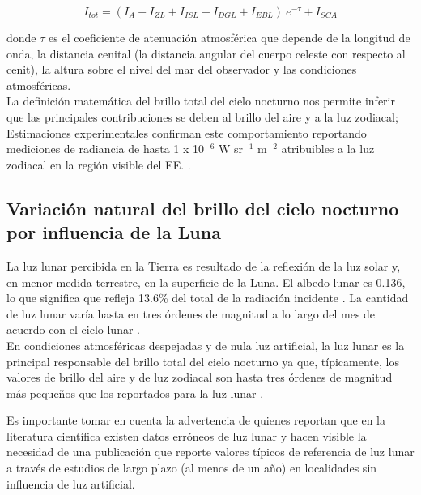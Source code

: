 \begin{equation}
I_{tot} = (I_A + I_{ZL} + I_{ISL} + I_{DGL} + I_{EBL})\:e^{-\tau} + I_{SCA}
\end{equation}

\vspace{2mm} 

donde $\tau$ es el coeficiente de atenuación atmosférica que depende de la longitud de onda, la distancia cenital (la distancia angular del cuerpo celeste con respecto al cenit), la altura sobre el nivel del mar del observador y las condiciones atmosféricas.\\ 

La definición matemática del brillo total del cielo nocturno nos permite inferir que las principales contribuciones se deben al brillo del aire y a la luz zodiacal; Estimaciones experimentales confirman este comportamiento reportando mediciones de radiancia de hasta 1 x 10$^{-6}$ W sr$^{-1}$  m$^{-2}$ atribuibles a la luz zodiacal en la región visible del EE. \citep{Leinert1998}.\\ 

\subsection{Variación natural del brillo del cielo nocturno por influencia de la Luna}

La luz lunar percibida en la Tierra es resultado de la reflexión de la luz solar y, en menor medida terrestre, en la superficie de la Luna. El albedo lunar es 0.136, lo que significa que refleja 13.6\% del total de la radiación incidente \citep{Matthews2008}. La cantidad de luz lunar varía hasta en tres órdenes de magnitud a lo largo del mes de acuerdo con el ciclo lunar \citep{Kyba2017}.\\

En condiciones atmosféricas despejadas y de nula luz artificial, la luz lunar es la principal responsable del brillo total del cielo nocturno ya que, típicamente, los valores de brillo del aire y de luz zodiacal son hasta tres órdenes de magnitud más pequeños que los reportados para la luz lunar \citep{Hanel2018}.\\

\newpage

Es importante tomar en cuenta la advertencia de \cite{Kyba2017} quienes reportan que en la literatura científica existen datos erróneos de luz lunar y hacen visible la necesidad de una publicación que reporte valores típicos de referencia de luz lunar a través de estudios de largo plazo (al menos de un año) en localidades sin influencia de luz artificial.\\ 

